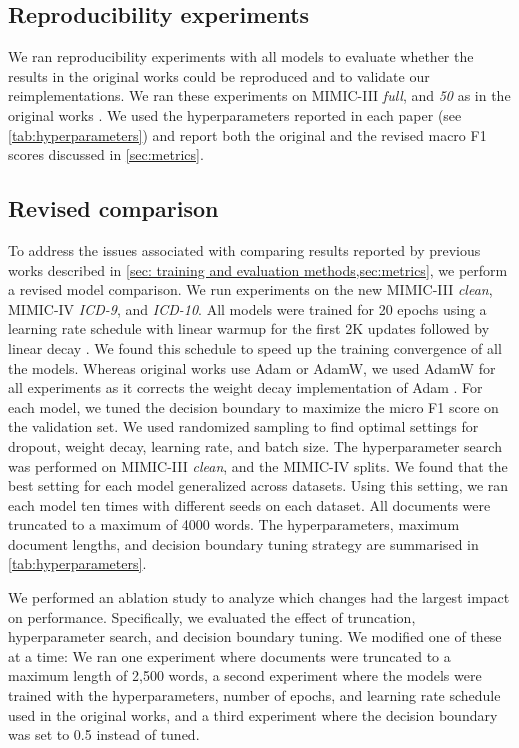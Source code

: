 {\subsection{Reproducibility experiments}

We ran reproducibility experiments with all models to evaluate whether the results in the original works could be reproduced and to validate our reimplementations. We ran these experiments on MIMIC-III \textit{full}, and \textit{50} as in the original works \parencite{mullenbachExplainablePredictionMedical2018,liICDCodingClinical2020,vuLabelAttentionModel2020,huangPLMICDAutomaticICD2022}. We used the hyperparameters reported in each paper (see \cref{tab:hyperparameters}) and report both the original and the revised macro F1 scores discussed in \cref{sec:metrics}.

\subsection{Revised comparison}
To address the issues associated with comparing results reported by previous works described in \cref{sec: training and evaluation methods,sec:metrics}, we perform a revised model comparison. We run experiments on the new MIMIC-III \textit{clean}, MIMIC-IV \textit{ICD-9}, and \textit{ICD-10}.
All models were trained for 20 epochs using a learning rate schedule with linear warmup for the first 2K updates followed by linear decay \parencite{huangPLMICDAutomaticICD2022}. We found this schedule to speed up the training convergence of all the models.
Whereas original works use Adam or AdamW, we used AdamW for all experiments as it corrects the weight decay implementation of Adam \parencite{kingmaAdamMethodStochastic2017, loshchilovDecoupledWeightDecay2022}. For each model, we tuned the decision boundary to maximize the micro F1 score on the validation set. We used randomized sampling to find optimal settings for dropout, weight decay, learning rate, and batch size. The hyperparameter search was performed on MIMIC-III \textit{clean}, and the MIMIC-IV splits. We found that the best setting for each model generalized across datasets. Using this setting, we ran each model ten times with different seeds on each dataset. All documents were truncated to a maximum of 4000 words. The hyperparameters, maximum document lengths, and decision boundary tuning strategy are summarised in \cref{tab:hyperparameters}. 

We performed an ablation study to analyze which changes had the largest impact on performance. 
Specifically, we evaluated the effect of truncation, hyperparameter search, and decision boundary tuning. We modified one of these at a time: We ran one experiment where documents were truncated to a maximum length of 2,500 words, a second experiment where the models were trained with the hyperparameters, number of epochs, and learning rate schedule used in the original works, and a third experiment where the decision boundary was set to 0.5 instead of tuned.

}
